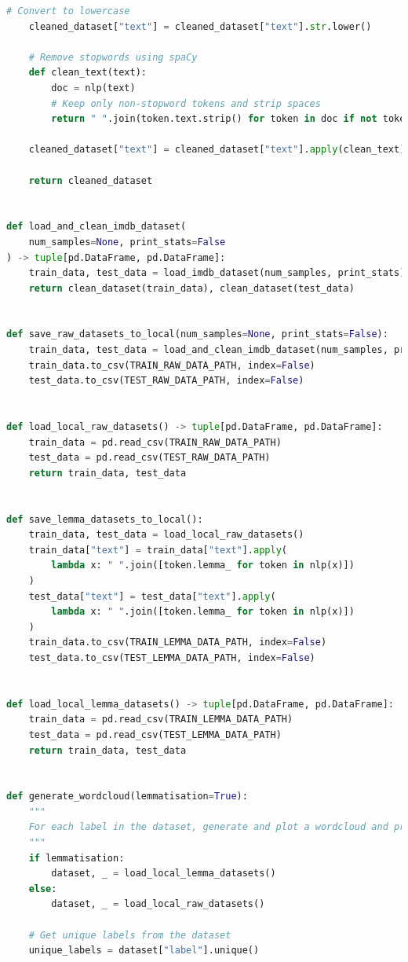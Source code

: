 \documentclass[12pt]{article}
\begin{document}
\begin{lstlisting}[language=Python]
    # Convert to lowercase
    cleaned_dataset["text"] = cleaned_dataset["text"].str.lower()

    # Remove stopwords using spaCy
    def clean_text(text):
        doc = nlp(text)
        # Keep only non-stopword tokens and strip spaces
        return " ".join(token.text.strip() for token in doc if not token.is_stop)

    cleaned_dataset["text"] = cleaned_dataset["text"].apply(clean_text)

    return cleaned_dataset


def load_and_clean_imdb_dataset(
    num_samples=None, print_stats=False
) -> tuple[pd.DataFrame, pd.DataFrame]:
    train_data, test_data = load_imdb_dataset(num_samples, print_stats)
    return clean_dataset(train_data), clean_dataset(test_data)


def save_raw_datasets_to_local(num_samples=None, print_stats=False):
    train_data, test_data = load_and_clean_imdb_dataset(num_samples, print_stats)
    train_data.to_csv(TRAIN_RAW_DATA_PATH, index=False)
    test_data.to_csv(TEST_RAW_DATA_PATH, index=False)


def load_local_raw_datasets() -> tuple[pd.DataFrame, pd.DataFrame]:
    train_data = pd.read_csv(TRAIN_RAW_DATA_PATH)
    test_data = pd.read_csv(TEST_RAW_DATA_PATH)
    return train_data, test_data


def save_lemma_datasets_to_local():
    train_data, test_data = load_local_raw_datasets()
    train_data["text"] = train_data["text"].apply(
        lambda x: " ".join([token.lemma_ for token in nlp(x)])
    )
    test_data["text"] = test_data["text"].apply(
        lambda x: " ".join([token.lemma_ for token in nlp(x)])
    )
    train_data.to_csv(TRAIN_LEMMA_DATA_PATH, index=False)
    test_data.to_csv(TEST_LEMMA_DATA_PATH, index=False)


def load_local_lemma_datasets() -> tuple[pd.DataFrame, pd.DataFrame]:
    train_data = pd.read_csv(TRAIN_LEMMA_DATA_PATH)
    test_data = pd.read_csv(TEST_LEMMA_DATA_PATH)
    return train_data, test_data


def generate_wordcloud(lemmatisation=True):
    """
    For each label in the dataset, generate and plot a wordcloud and print the top 20 most frequent words.
    """
    if lemmatisation:
        dataset, _ = load_local_lemma_datasets()
    else:
        dataset, _ = load_local_raw_datasets()

    # Get unique labels from the dataset
    unique_labels = dataset["label"].unique()


\end{lstlisting}
\end{document}
